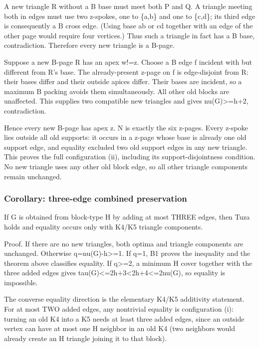 \documentclass[11pt]{article}
\begin{document}
A new triangle R without a B base must meet both P and Q. A triangle meeting both in edges must use two z-spokes, one to \{a,b\} and one to \{c,d\}; its third edge is consequently a B cross edge. (Using base ab or cd together with an edge of the other page would require four vertices.) Thus such a triangle in fact has a B base, contradiction. Therefore every new triangle is a B-page.

Suppose a new B-page R has an apex w!=z. Choose a B edge f incident with but different from R's base. The already-present z-page on f is edge-disjoint from R: their bases differ and their outside apices differ. Their bases are incident, so a maximum B packing avoids them simultaneously. All other old blocks are unaffected. This supplies two compatible new triangles and gives nu(G)\textgreater=h+2, contradiction.

Hence every new B-page has apex z. N is exactly the six z-pages. Every z-spoke lies outside all old supports: it occurs in a z-page whose base is already one old support edge, and equality excluded two old support edges in any new triangle. This proves the full configuration (ii), including its support-disjointness condition. No new triangle uses any other old block edge, so all other triangle components remain unchanged.

\subsubsection{Corollary: three-edge combined preservation}\label{corollary-three-edge-combined-preservation}

If G is obtained from block-type H by adding at most THREE edges, then Tuza holds and equality occurs only with K4/K5 triangle components.

Proof. If there are no new triangles, both optima and triangle components are unchanged. Otherwise q=nu(G)-h\textgreater=1. If q=1, B1 proves the inequality and the theorem above classifies equality. If q\textgreater=2, a minimum H cover together with the three added edges gives tau(G)\textless=2h+3\textless2h+4\textless=2nu(G), so equality is impossible.

The converse equality direction is the elementary K4/K5 additivity statement. For at most TWO added edges, any nontrivial equality is configuration (i): turning an old K4 into a K5 needs at least three added edges, since an outside vertex can have at most one H neighbor in an old K4 (two neighbors would already create an H triangle joining it to that block).
\end{document}

